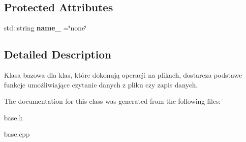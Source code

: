 \subsection*{Protected Attributes}
\begin{DoxyCompactItemize}
\item 
\mbox{\label{class_base_ace990b7abe15279f1bcf958f3a1f0d6b}} 
std\+::string {\bfseries name\+\_\+} =\char`\"{}none\char`\"{}
\end{DoxyCompactItemize}


\subsection{Detailed Description}
Klasa bazowa dla klas, które dokonują operacji na plikach, dostarcza podstawe funkcje umożliwiające czytanie danych z pliku czy zapis danych. 

The documentation for this class was generated from the following files\+:\begin{DoxyCompactItemize}
\item 
base.\+h\item 
base.\+cpp\end{DoxyCompactItemize}
